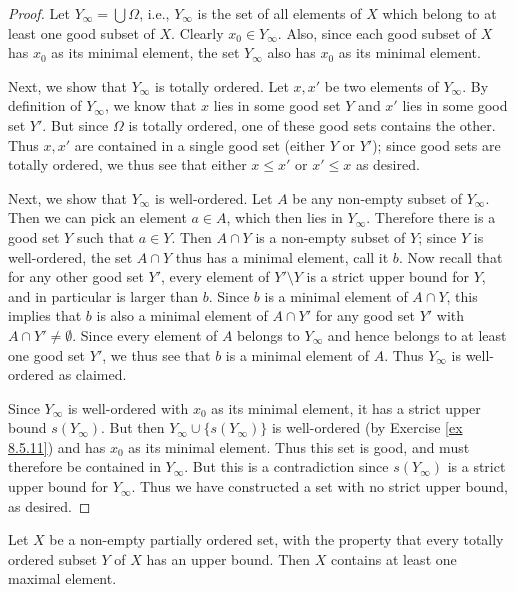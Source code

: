 \begin{proof}
    Let \(Y_{\infty} = \bigcup \Omega\), i.e., \(Y_{\infty}\) is the set of all elements of \(X\) which belong to at least one good subset of \(X\).
    Clearly \(x_0 \in Y_{\infty}\).
    Also, since each good subset of \(X\) has \(x_0\) as its minimal element, the set \(Y_{\infty}\) also has \(x_0\) as its minimal element.

    Next, we show that \(Y_{\infty}\) is totally ordered.
    Let \(x, x'\) be two elements of \(Y_{\infty}\).
    By definition of \(Y_{\infty}\), we know that \(x\) lies in some good set \(Y\) and \(x'\) lies in some good set \(Y'\).
    But since \(\Omega\) is totally ordered, one of these good sets contains the other.
    Thus \(x, x'\) are contained in a single good set (either \(Y\) or \(Y'\));
    since good sets are totally ordered, we thus see that either \(x \leq x'\) or \(x' \leq x\) as desired.

    Next, we show that \(Y_{\infty}\) is well-ordered.
    Let \(A\) be any non-empty subset of \(Y_{\infty}\).
    Then we can pick an element \(a \in A\), which then lies in \(Y_{\infty}\).
    Therefore there is a good set \(Y\) such that \(a \in Y\).
    Then \(A \cap Y\) is a non-empty subset of \(Y\);
    since \(Y\) is well-ordered, the set \(A \cap Y\) thus has a minimal element, call it \(b\).
    Now recall that for any other good set \(Y'\), every element of \(Y' \setminus Y\) is a strict upper bound for \(Y\), and in particular is larger than \(b\).
    Since \(b\) is a minimal element of \(A \cap Y\), this implies that \(b\) is also a minimal element of \(A \cap Y'\) for any good set \(Y'\) with \(A \cap Y' \neq \emptyset\).
    Since every element of \(A\) belongs to \(Y_{\infty}\) and hence belongs to at least one good set \(Y'\), we thus see that \(b\) is a minimal element of \(A\).
    Thus \(Y_{\infty}\) is well-ordered as claimed.

    Since \(Y_{\infty}\) is well-ordered with \(x_0\) as its minimal element, it has a strict upper bound \(s(Y_{\infty})\).
    But then \(Y_{\infty} \cup \{s(Y_{\infty})\}\) is well-ordered (by Exercise \ref{ex 8.5.11}) and has \(x_0\) as its minimal element.
    Thus this set is good, and must therefore be contained in \(Y_{\infty}\).
    But this is a contradiction since \(s(Y_{\infty})\) is a strict upper bound for \(Y_{\infty}\).
    Thus we have constructed a set with no strict upper bound, as desired.
\end{proof}

\begin{lemma}\label{8.5.15}
    Let \(X\) be a non-empty partially ordered set, with the property that every totally ordered subset \(Y\) of \(X\) has an upper bound.
    Then \(X\) contains at least one maximal element.
\end{lemma}

